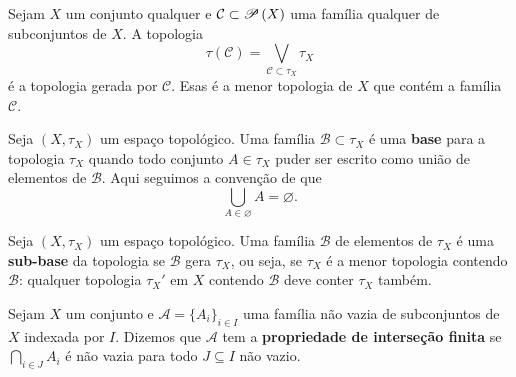  \begin{definition}
 Sejam 
 $X$
 um conjunto qualquer e
 $\mathcal{C} \subset {{\mathscr{P}}\left(X\right)}$
 uma família qualquer de subconjuntos de
 $X$.
 A topologia
 \begin{equation*}
     \tau(\mathcal{C}) = \bigvee_{\mathcal{C} \subset \tau_X} \tau_X
 \end{equation*}
 é a topologia gerada por 
 $\mathcal{C}$.
 Esas é a menor topologia de
 $X$
 que contém a família
 $\mathcal{C}$.
 \end{definition}
 
 \begin{definition}[Base]
 Seja
 $(X, \tau_X)$
 um espaço topológico.
 Uma família
 $\mathcal{B} \subset \tau_X$
 é uma \textbf{base} para a topologia
 $\tau_X$
 quando todo conjunto
 $A \in \tau_X$
 puder ser escrito como união de elementos de
 $\mathcal{B}$.
 Aqui seguimos a convenção de que
 \begin{equation*}
     \bigcup_{A \in \varnothing} A = \varnothing.
 \end{equation*}
 \end{definition}
 
 \begin{definition}
 Seja
 $(X, \tau_X)$
 um espaço topológico. 
 Uma família
 $\mathcal{B}$
 de elementos de
 $\tau_X$
 é uma \textbf{sub-base} da topologia se
 $\mathcal{B}$
 gera 
 $\tau_X$, 
 ou seja,
 se
 $\tau_X$
 é a menor topologia contendo
 $\mathcal{B}$:
 qualquer topologia
 $\tau_X'$
 em 
 $X$
 contendo
 $\mathcal{B}$
 deve conter
 $\tau_X$
 também.
 \end{definition}
 
 \begin{definition}
 Sejam
 $X$
 um conjunto e
 $\mathcal{A} = \{A_i\}_{i\in I}$
 uma família não vazia de subconjuntos de
 $X$
 indexada por 
 $I$.
 Dizemos que
 $\mathcal{A}$
 tem a \textbf{propriedade de interseção finita}
 se
 $\displaystyle{ \bigcap _{i\in J}A_{i} }$
 é não vazia para todo
 $J \subseteq I$
 não vazio.
 \end{definition}